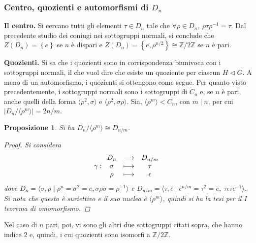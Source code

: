 \documentclass[11pt]{scrartcl}
\theoremstyle{style1}
\newtheorem{prop}{Proposizione}[section]
\numberwithin{equation}{subsection}
\renewcommand{\textbf}[1]{\textsf{\bfseries #1}}
\begin{document}
\subsubsection{Centro, quozienti e automorfismi di $D_n$}
\hfill

\textbf{Il centro.} Si cercano tutti gli elementi $\tau  \in D_n$ tale che $\forall \rho  \in D_n, \ \rho \tau \rho ^{-1}=\tau $.
Dal precedente studio dei coniugi nei sottogruppi normali, si conclude che $Z(D_n) = \left\{ e \right\} $ se $n$ \`e dispari e $Z(D_n)=\left\{ e, \rho ^{n / 2}  \right\}\cong \mathbb{Z} / 2\mathbb{Z}$ se $n$ \`e pari.

\vspace{5pt}

\textbf{Quozienti.} 
Si sa che i quozienti sono in corrispondenza biunivoca con i sottogruppi normali, il che vuol dire che esiste un quoziente per ciascun $H \lhd G$.
A meno di un automorfismo, i quozienti si ottengono come segue.
Per quanto visto precedentemente, i sottogruppi normali sono i sottogruppi di $C_n$ e, se $n$ \`e pari, anche quelli della forma $\langle \rho ^2 , \sigma  \rangle$ e $\langle \rho ^2, \sigma \rho  \rangle$. 
Sia, $\langle \rho ^m \rangle< C_n$, con $ m \mid n$, per cui $\lvert D_n / \langle \rho ^m \rangle \rvert = 2n/m$.
\begin{prop}
	Si ha $D_n / \langle \rho ^m \rangle\cong D _{n / m} $.
	\begin{proof}
		Si considera 
		\[
		\gamma : 
		\begin{array}
			{c c c}
			D_n & \longrightarrow& D_{ n / m } \\
			\sigma &\longmapsto & \tau \\
			\rho  &\longmapsto & \epsilon 
		\end{array}
		\] 
		dove $D_n = \langle \sigma ,\rho  \mid \rho ^n = \sigma ^2 = e , \sigma \rho \sigma = \rho ^{-1} \rangle$ e $D_{n / m} = \langle \tau ,\epsilon  \mid \epsilon ^{ n / m} = \tau ^2 = e , \ \tau \epsilon \tau \epsilon ^{-1} \rangle$.
		Si nota che questo \`e suriettivo e il suo nucleo \`e $\langle \rho ^m \rangle$, quindi si ha la tesi per il I teorema di omomorfismo.
	\end{proof}
\end{prop}
\noindent Nel caso di $n$ pari, poi, vi sono gli altri due sottogruppi citati sopra, che hanno indice $2$ e, quindi, i cui quozienti sono isomorfi a $\mathbb{Z} / 2\mathbb{Z}$.
\end{document}
